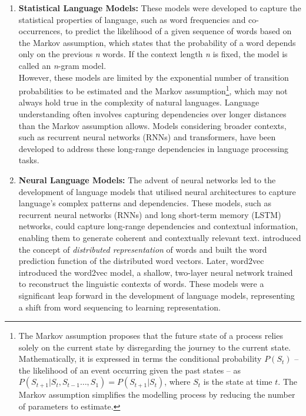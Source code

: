 \begin{enumerate}
	\item \textbf{Statistical Language Models:} {These models were developed to capture the statistical properties of language, such as word frequencies and co-occurrences, to predict the likelihood of a given sequence of words based on the Markov assumption, which states that the probability of a word depends only on the previous \textit{n} words.
		      If the context length \textit{n} is fixed, the model is called an \textit{n}-gram model.\\
		      However, these models are limited by the exponential number of transition probabilities to be estimated and the Markov assumption\footnote{The Markov assumption proposes that the future state of a process relies solely on the current state by disregarding the journey to the current state. Mathematically, it is expressed in terms the conditional probability \(P(S_t)\) -- the likelihood of an event occurring given the past states -- as \(P(S_{t+1} | S_t, S_{t-1} \ldots, S_1) = P(S_{t+1} | S_t)\), where \(S_t\) is the state at time \(t\). The Markov assumption simplifies the modelling process by reducing the number of parameters to estimate.}, which may not always hold true in the complexity of natural languages.
		      Language understanding often involves capturing dependencies over longer distances than the Markov assumption allows. Models considering broader contexts, such as recurrent neural networks (RNNs) and transformers, have been developed to address these long-range dependencies in language processing tasks.}
	\item \textbf{Neural Language Models:} {The advent of neural networks led to the development of language models that utilised neural architectures to capture language's complex patterns and dependencies.
		      These models, such as recurrent neural networks (RNNs) and long short-term memory (LSTM) networks, could capture long-range dependencies and contextual information, enabling them to generate coherent and contextually relevant text.
		      \textcite{bengio2003neural} introduced the concept of \textit{distributed representation} of words and built the word prediction function of the distributed word vectors.
		      Later, word2vec~\cite{mikolov2013distributed, mikolov2013efficient} introduced the word2vec model, a shallow, two-layer neural network trained to reconstruct the linguistic contexts of words.
		      These models were a significant leap forward in the development of language models, representing a shift from word sequencing to learning representation.}

\end{enumerate}
